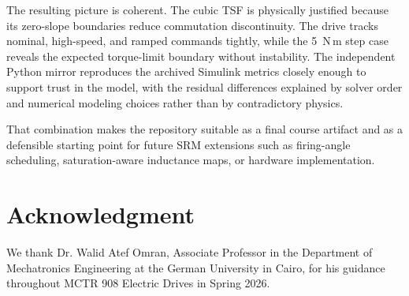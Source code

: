 \documentclass[conference]{IEEEtran}
\begin{document}
The resulting picture is coherent.
The cubic TSF is physically justified because its zero-slope boundaries reduce commutation discontinuity.
The drive tracks nominal, high-speed, and ramped commands tightly, while the 5~N\,m step case reveals the expected torque-limit boundary without instability.
The independent Python mirror reproduces the archived Simulink metrics closely enough to support trust in the model, with the residual differences explained by solver order and numerical modeling choices rather than by contradictory physics.

That combination makes the repository suitable as a final course artifact and as a defensible starting point for future SRM extensions such as firing-angle scheduling, saturation-aware inductance maps, or hardware implementation.

\section*{Acknowledgment}
We thank Dr. Walid Atef Omran, Associate Professor in the Department of Mechatronics Engineering at the German University in Cairo, for his guidance throughout MCTR 908 Electric Drives in Spring 2026.



\end{document}
